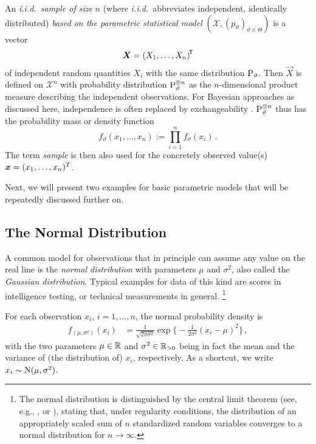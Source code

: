 An \emph{i.i.d.\ sample of size} $n$ (where \emph{i.i.d.}\ abbreviates independent, identically distributed)
\emph{based on the parametric statistical model} %
$(\mathcal{X}, (p_\vartheta)_{\vartheta \in \Theta})$ is a vector
\[
\vec{X} = (X_1, \ldots, X_n)^\tra %
\]
of independent random quantities $X_i$ with the same distribution $\operatorname{P}_\vartheta$.
Then $\vec{X}$ is defined on $\mathcal{X}^n$ with probability distribution $\operatorname{P}_\vartheta^{\otimes n}$
as the $n$-dimensional product measure describing the independent observations.
For Bayesian approaches as discussed here,
independence is often replaced by exchangeability \parencite[see, e.g.,][\S 4.2]{2000:bernardosmith}.
$\operatorname{P}_\vartheta^{\otimes n}$ thus has the probability mass or density function
\[
f_\vartheta(x_1, \ldots, x_n) := \prod_{i=1}^{n} f_\vartheta(x_i)\,.%
\]
The term \emph{sample} is then also used for the concretely observed value(s) ${\bm x}=(x_1, \ldots, x_n)^T$.%

Next, we will present two examples for basic parametric models that will be repeatedly discussed further on.


\subsection{The Normal Distribution}
\label{sec:normaldist}

A common model for observations that in principle can assume any value on the real line
is the \emph{normal distribution} with parameters $\mu$ and $\sigma^2$, also called the \emph{Gaussian distribution}.
Typical examples for data of this kind are scores in intelligence testing, or technical measurements in general.%
\footnote{The normal distribution is distinguished by the central limit theorem
(see, e.g., \cite[\S 7.3]{1993:karr}, or \cite[\S 9]{1968:breiman}), stating that, under regularity conditions,
the distribution of an appropriately scaled sum of $n$ standardized random variables converges to a normal distribution
for $n \to \infty$.}

For each observation $x_i$, $i=1,\ldots, n$, the normal probability density is
\begin{align*}
f_{(\mu, \sigma^2)}(x_{i}) &= \frac{1}{\sqrt{2\pi\sigma^2}}\exp\Big\{ -\frac{1}{2\sigma^2}(x_{i} - \mu)^2 \Big\}\,,
\end{align*}
with the two parameters $\mu \in \mathbb{R}$ and $\sigma^2 \in \mathbb{R}_{>0}$
being in fact the mean and the variance of (the distribution of) $x_i$, respectively.
As a shortcut, we write $x_i \sim \operatorname{N}(\mu, \sigma^2)$.

